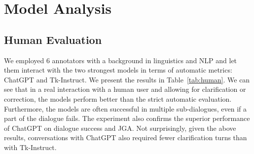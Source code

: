 \section{Model Analysis}
\label{07:sec:analysis}

\subsection{Human Evaluation}
\label{07:sec:human}
We employed 6 annotators with a background in linguistics and NLP and let them interact with the two strongest models in terms of automatic metrics: ChatGPT and Tk-Instruct.
We present the results in Table~\ref{tab:human}.
We can see that in a real interaction with a human user and allowing for clarification or correction, the models perform better than the strict automatic evaluation.
Furthermore, the models are often successful in multiple sub-dialogues, even if a part of the dialogue fails.
The experiment also confirms the superior performance of ChatGPT on dialogue success and JGA.
Not surprisingly, given the above results, conversations with ChatGPT also required fewer clarification turns than with Tk-Instruct.

